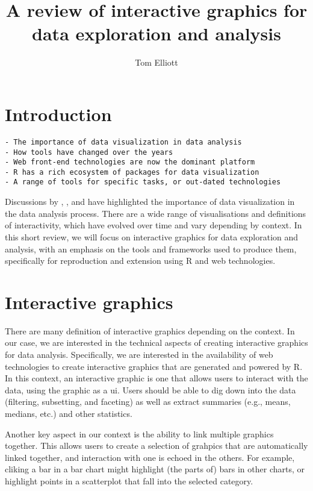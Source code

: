 \documentclass{article}
\title{A review of interactive graphics for data exploration and analysis}
\author{Tom Elliott}
\affil{iNZight Analytics Ltd}
\affil{University of Auckland}
\date{}
\newcommand{\prog}[1]{{\sf #1}}
\newcommand{\R}{\prog{R}}
\begin{document}
\maketitle

\begin{abstract}

\end{abstract}

\section{Introduction}
\label{sec:intro}

\begin{verbatim}
- The importance of data visualization in data analysis
- How tools have changed over the years
- Web front-end technologies are now the dominant platform
- R has a rich ecosystem of packages for data visualization
- A range of tools for specific tasks, or out-dated technologies
\end{verbatim}

Discussions by \cite{Cook2007}, \cite{Theus2014}, and \cite{Ward2015} have highlighted the importance of data visualization in the data analysis process.
There are a wide range of visualisations and definitions of interactivity, which have evolved over time and vary depending by context.
In this short review, we will focus on interactive graphics for data exploration and analysis, with an emphasis on the tools and frameworks used to produce them, specifically for reproduction and extension using \R{} and web technologies.

\section{Interactive graphics}
\label{sec:interactive-graphics}

There are many definition of interactive graphics depending on the context.
In our case, we are interested in the technical aspects of creating interactive graphics for data analysis.
Specifically, we are interested in the availability of web technologies to create interactive graphics that are generated and powered by \R{}.
In this context, an interactive graphic is one that allows users to interact with the data, using the graphic as a \gls{ui}.
Users should be able to dig down into the data (filtering, subsetting, and faceting) as well as extract summaries (e.g., means, medians, etc.) and other statistics.

Another key aspect in our context is the ability to link multiple graphics together.
This allows users to create a selection of grahpics that are automatically linked together, and interaction with one is echoed in the others.
For example, cliking a bar in a bar chart might highlight (the parts of) bars in other charts, or highlight points in a scatterplot that fall into the selected category.
\end{document}
